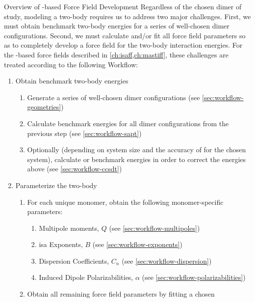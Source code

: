 \begin{section}{Overview of \sapt-based Force Field Development}
Regardless of the chosen dimer of study, modeling a 
two-body \pes requires us to address two major challenges.  First, we must
obtain benchmark two-body energies for a series of well-chosen dimer
configurations. Second, we must
calculate and/or fit all force field parameters so as to completely develop a
force field for the two-body interaction energies. For the \sapt-based force fields described in
\cref{ch:isaff,ch:mastiff}, 
these challenges are treated according to the following Workflow:

%
\begin{minipage}{\linewidth}
\begin{enumerate}[label=\Roman*)]
\item Obtain benchmark two-body energies
\label{workflow:step1}
    \begin{enumerate}[label=\arabic*)]
    \item Generate a series of well-chosen dimer configurations
        (see \cref{sec:workflow-geometries})
    \item Calculate \dftsapt benchmark energies for all dimer configurations from
the previous step
        (see \cref{sec:workflow-sapt})
    \item Optionally (depending on system size and the accuracy of \dftsapt
for the chosen system), calculate \ccsdt or \ccsdtf benchmark energies in
order to correct the \dftsapt energies above
        (see \cref{sec:workflow-ccsdt})
    \end{enumerate}
\item Parameterize the two-body \pes
\label{workflow:step2}
    \begin{enumerate}[label=\arabic*)]
    \item For each unique monomer, obtain the following monomer-specific parameters:
        \begin{enumerate}
        \item Multipole moments, $Q$
            (see \cref{sec:workflow-multipoles})
        \item \acrshort{isa} Exponents, $B$ 
            (see \cref{sec:workflow-exponents})
        \item Dispersion Coefficients, $C_n$
            (see \cref{sec:workflow-dispersion})
        \item Induced Dipole Polarizabilities, $\alpha$
            (see \cref{sec:workflow-polarizabilities})
        \end{enumerate}
    \item Obtain all remaining force field parameters by fitting a chosen

\end{enumerate}
\end{enumerate}
\end{minipage}
\end{section}
